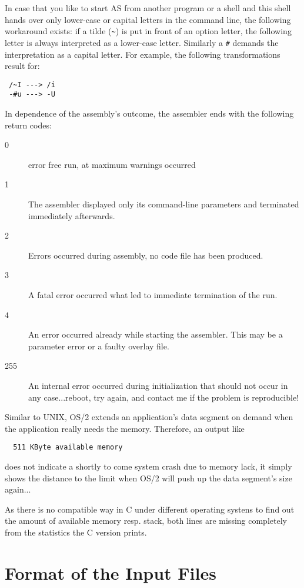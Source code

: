 \documentclass[12pt,twoside]{report}
\newcommand{\tty}[1]{{\tt #1}}
\begin{document}
In case that you like to start AS from another program or a shell and
this shell hands over only lower-case or capital letters in the
command line, the following workaround exists: if a tilde (\verb!~!) is put
in front of an option letter, the following letter is always
interpreted as a lower-case letter.  Similarly a \tty{\#} demands the
interpretation as a capital letter.  For example, the following
transformations result for:
\begin{verbatim}
 /~I ---> /i
 -#u ---> -U
\end{verbatim}
In dependence of the assembly's outcome, the assembler ends with
the following return codes:
\begin{description}
\item[0]{error free run, at maximum warnings occurred}
\item[1]{The assembler displayed only its command-line parameters and 
         terminated immediately afterwards.}
\item[2]{Errors occurred during assembly, no code file has been produced.}
\item[3]{A fatal error occurred what led to immediate termination of the run.}
\item[4]{An error occurred already while starting the assembler.
         This may be a parameter error or a faulty overlay file.}
\item[255]{An internal error occurred during initialization that should not
         occur in any case...reboot, try again, and contact me if the
         problem is reproducible!}
\end{description}
Similar to UNIX, OS/2  extends an application's data
segment on demand when the application really needs the memory. 
Therefore, an output like
\begin{verbatim}
  511 KByte available memory
\end{verbatim}
does not indicate a shortly to come system crash due to memory lack,
it simply shows the distance to the limit when OS/2 will push up the
data segment's size again...

As there is no compatible way in C  under different
operating systens to find out the amount of available memory resp. stack,
both lines are missing completely from the statistics the C version prints.


\section{Format of the Input Files}
\label{AttrTypes}
\end{document}
